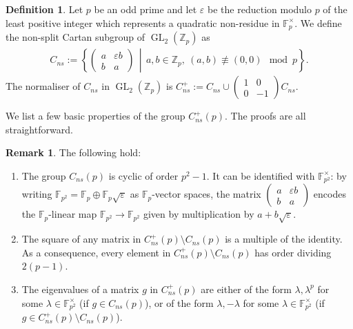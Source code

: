 \documentclass{amsart}
\theoremstyle{definition}
\newtheorem{definition}[theorem]{Definition}
\newtheorem{remark}[theorem]{Remark}
\newcommand{\Z}{\mathbb{Z}}
\newcommand{\F}{\mathbb{F}}
\newcommand{\GL}{\operatorname{GL}}
\numberwithin{theorem}{section}
\numberwithin{equation}{section}
\begin{document}
\begin{definition}\label{def:cartan}
	Let $p$ be an odd prime and let $\varepsilon$ be the reduction modulo $p$ of the least positive integer which represents a quadratic non-residue in $\F_p^\times$. We define the non-split Cartan subgroup of $\GL_2(\Z_p)$ as
	\begin{align*}
		C_{ns}:= \left\lbrace \begin{pmatrix} a & \varepsilon b \\ b & a \end{pmatrix} \,\middle|\, a,b \in \Z_p, \ (a,b) \not\equiv (0,0) \mod p \right\rbrace.
	\end{align*}
	The normaliser of $C_{ns}$ in $\GL_2(\Z_p)$ is $C_{ns}^+:= C_{ns} \cup \begin{pmatrix} 1 & 0 \\ 0 & -1 \end{pmatrix} C_{ns}$.
\end{definition}

We list a few basic properties of the group $C_{ns}^+(p)$. The proofs are all straightforward.
\begin{remark}\label{rmk: basic properties Cns}
    The following hold:
    \begin{enumerate}
        \item The group $C_{ns}(p)$ is cyclic of order $p^2-1$. It can be identified with $\mathbb{F}_{p^2}^\times$: by writing $\mathbb{F}_{p^2} = \mathbb{F}_p \oplus \mathbb{F}_p \sqrt{\varepsilon}$ as $\mathbb{F}_p$-vector spaces, the matrix $\left( \begin{smallmatrix}
            a & \varepsilon b \\
            b & a
        \end{smallmatrix} \right)$ encodes the $\F_p$-linear map $\mathbb{F}_{p^2} \to\mathbb{F}_{p^2}$ given by multiplication by $a+b\sqrt{\varepsilon}$.
        \item The square of any matrix in $C_{ns}^+(p) \setminus C_{ns}(p)$ is a multiple of the identity. As a consequence, every element in $C_{ns}^+(p) \setminus C_{ns}(p)$ has order dividing $2(p-1)$.
        \item The eigenvalues of a matrix $g$ in $C_{ns}^+(p)$ are either of the form $\lambda, \lambda^p$ for some $\lambda \in \mathbb{F}_{p^2}^\times$ (if $g \in C_{ns}(p)$), or of the form $\lambda, -\lambda$ for some $\lambda \in \mathbb{F}_{p^2}^\times$ (if $g \in C_{ns}^+(p) \setminus C_{ns}(p)$).
    \end{enumerate}
\end{remark}
\end{document}
